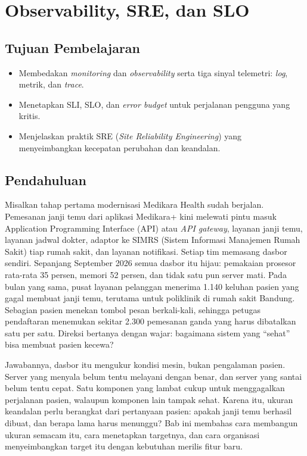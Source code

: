 \chapter{Observability, SRE, dan SLO}
\label{ch:ch11}

\section*{Tujuan Pembelajaran}
\begin{itemize}
  \item Membedakan \textit{monitoring} dan \textit{observability} serta tiga sinyal telemetri: \textit{log}, metrik, dan \textit{trace}.
  \item Menetapkan SLI, SLO, dan \textit{error budget} untuk perjalanan pengguna yang kritis.
  \item Menjelaskan praktik SRE (\textit{Site Reliability Engineering}) yang menyeimbangkan kecepatan perubahan dan keandalan.
\end{itemize}

\section{Pendahuluan}

Misalkan tahap pertama modernisasi Medikara Health sudah berjalan. Pemesanan janji temu dari
aplikasi Medikara+ kini melewati pintu masuk Application Programming Interface (API) atau
\textit{API gateway}, layanan janji temu, layanan jadwal dokter, adaptor ke SIMRS (Sistem
Informasi Manajemen Rumah Sakit) tiap rumah sakit, dan layanan notifikasi. Setiap tim memasang
dasbor sendiri. Sepanjang September 2026 semua dasbor itu hijau: pemakaian prosesor rata-rata 35
persen, memori 52 persen, dan tidak satu pun server mati. Pada bulan yang sama, pusat layanan
pelanggan menerima 1.140 keluhan pasien yang gagal membuat janji temu, terutama untuk poliklinik
di rumah sakit Bandung. Sebagian pasien menekan tombol pesan berkali-kali, sehingga petugas
pendaftaran menemukan sekitar 2.300 pemesanan ganda yang harus dibatalkan satu per satu. Direksi
bertanya dengan wajar: bagaimana sistem yang ``sehat'' bisa membuat pasien kecewa?

Jawabannya, dasbor itu mengukur kondisi mesin, bukan pengalaman pasien. Server yang menyala belum
tentu melayani dengan benar, dan server yang santai belum tentu cepat. Satu komponen yang lambat
cukup untuk menggagalkan perjalanan pasien, walaupun komponen lain tampak sehat. Karena itu,
ukuran keandalan perlu berangkat dari pertanyaan pasien: apakah janji temu berhasil dibuat, dan
berapa lama harus menunggu? Bab ini membahas cara membangun ukuran semacam itu, cara menetapkan
targetnya, dan cara organisasi menyeimbangkan target itu dengan kebutuhan merilis fitur baru.

